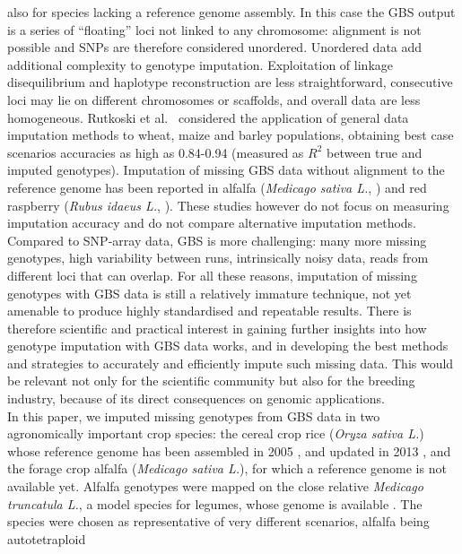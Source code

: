 also for species lacking a reference genome assembly. In this case the 
GBS output is a series of ``floating'' loci not linked to any chromosome:
alignment is not possible and SNPs are therefore considered unordered. Unordered 
data add additional complexity to genotype imputation. Exploitation of linkage 
disequilibrium and haplotype reconstruction 
are less straightforward, consecutive loci may lie on different chromosomes
or scaffolds, and overall data are less homogeneous.
Rutkoski et al.~\cite{rutkoski_imputation_2013}
considered the application of general data imputation methods 
to wheat, maize and barley populations, obtaining best case scenarios accuracies 
as high as 0.84-0.94 (measured as $R^{2}$ between true and imputed genotypes).
Imputation of missing GBS data without alignment to the reference genome has
been reported in alfalfa (\emph{Medicago sativa L.}, \cite{Rocher_validation_2015})
and red raspberry (\emph{Rubus idaeus L.}, \cite{ward_saturated_2013}). These studies
however do not focus on measuring imputation accuracy and do not compare
alternative imputation methods.\\
	Compared to SNP-array data, GBS is more challenging: many more 
	missing genotypes, high variability between runs, intrinsically noisy data, 
	reads from different loci that can overlap. For all these reasons, imputation 
	of missing genotypes with GBS data is still a relatively immature technique, 
	not yet amenable to produce highly standardised and repeatable results. 
There is therefore scientific and practical interest in gaining further 
insights into how genotype imputation with GBS data works, and in 
developing the best methods and strategies to accurately and efficiently 
impute such missing data. This would be relevant not only for the scientific 
community but also for the breeding industry, because of its direct 
consequences on genomic applications.\\
In this paper, we imputed missing genotypes from GBS data in two agronomically
important crop species:
the cereal crop rice (\emph{Oryza sativa L.}) whose reference genome has been 
assembled in 2005 \cite{international_rice_genome_sequencing_project_map-based_2005},
and updated in 2013 \cite{kawahara_improvement_2013},
and
the forage crop alfalfa (\emph{Medicago sativa L.}), for 
which a reference genome is not available yet. Alfalfa genotypes
were mapped on the close relative \emph{Medicago truncatula L.}, a model species
for legumes, whose genome is available \cite{young_medicago_2011}.
The species were chosen as representative of very different scenarios, alfalfa being autotetraploid
